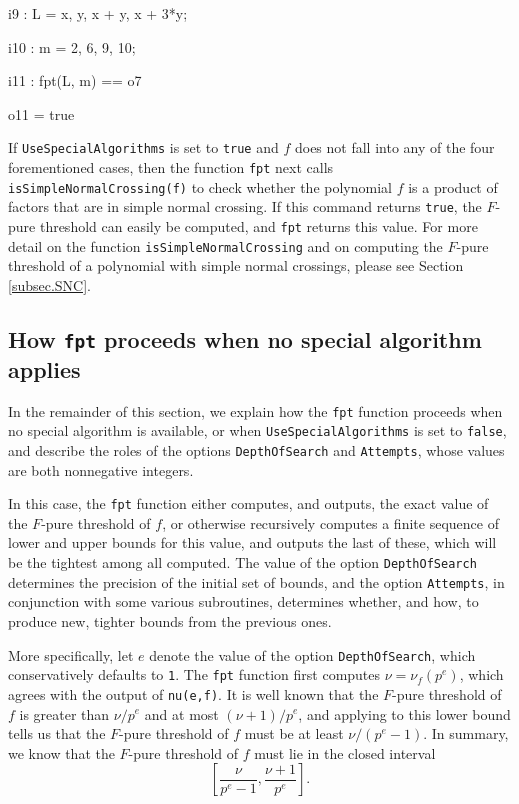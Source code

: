 \documentclass{amsart}
\begin{document}
{\small
{}
\begin{MyVerbatim}

i9 : L = {x, y, x + y, x + 3*y};

i10 : m = {2, 6, 9, 10};

i11 : fpt(L, m) == o7

o11 = true
\end{MyVerbatim}
}
\medspace

If {\tt UseSpecialAlgorithms} is set to {\tt true} and $f$ does not fall into any of the four forementioned cases, then the function {\tt fpt} next calls {\tt isSimpleNormalCrossing(f)} to check whether the polynomial $f$ is a product of factors that are in simple normal crossing.  If this command returns {\tt true}, the $F$-pure threshold can easily be computed, and {\tt fpt} returns this value.  For more detail on the function {\tt isSimpleNormalCrossing} and on computing the $F$-pure threshold of a polynomial with simple normal crossings, please see Section \ref{subsec.SNC}.


\subsection{How {\tt fpt} proceeds when no special algorithm applies}

In the remainder of this section, we explain how the {\tt fpt} function proceeds when no special algorithm is available, or when {\tt UseSpecialAlgorithms} is set to {\tt false}, and describe the roles of the options {\tt DepthOfSearch} and {\tt Attempts}, whose values are both nonnegative integers.

In this case, the {\tt fpt} function either computes, and outputs, the exact value of the $F$-pure threshold of $f$, or otherwise recursively computes a finite sequence of lower and upper bounds for this value, and outputs the last of these, which will be the tightest among all computed.  The value of the option {\tt DepthOfSearch} determines the precision of the initial set of bounds, and the option {\tt Attempts}, in conjunction with some various subroutines, determines whether, and how, to produce new, tighter bounds from the previous ones.


More specifically, let $e$ denote the value of the option {\tt DepthOfSearch}, which conservatively defaults to {\tt 1}.  The {\tt fpt} function first computes $\nu=\nu_f(p^e)$, which agrees with the output of {\tt nu(e,f)}.  It is well known that the $F$-pure threshold of $f$ is greater than $\nu/p^e$ and at most $(\nu+1)/p^e$, and applying  \cite[Proposition 4.2]{HernandezFPurityOfHypersurfaces} to this lower bound tells us that the $F$-pure threshold of $f$ must be at least $\nu/(p^e-1)$.  In summary, we know that the $F$-pure threshold of $f$ must lie in the closed interval
%
\begin{equation}
\label{estimating-interval: e}
\tag{$\dagger$}
\left[ \frac{\nu}{p^e-1}, \frac{\nu+1}{p^e} \right].
\end{equation}
\end{document}
